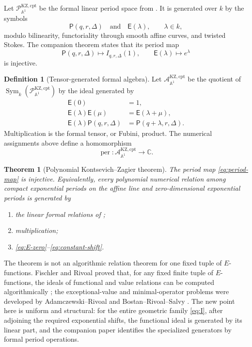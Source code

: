 \documentclass[11pt]{article}
\numberwithin{equation}{section}
\newtheorem{theorem}{Theorem}[section]
\theoremstyle{definition}
\newtheorem{definition}[definition]{Definition}
\theoremstyle{remark}
\newcommand{\C}{\mathbb C}
\newcommand{\Aone}{\mathbb A^1}
\newcommand{\Sym}{\operatorname{Sym}}
\newcommand{\per}{\operatorname{per}}
\newcommand{\Pcal}{\mathcal P}
\newcommand{\Acal}{\mathcal A}
\begin{document}
Let $\Pcal_{\Aone}^{\mathrm{KZ,cpt}}$ be the formal linear period space from
\cite{LongLinearKZ}.  It is generated over $k$ by the symbols
\[
  \mathsf P(q,r,\Delta)
  \quad\text{and}\quad
  \mathsf E(\lambda),\qquad \lambda\in k,
\]
modulo bilinearity, functoriality through smooth affine curves, and twisted
Stokes.  The companion theorem states that its period map
\[
  \mathsf P(q,r,\Delta)\longmapsto I_{q,r,\Delta}(1),
  \qquad
  \mathsf E(\lambda)\longmapsto e^\lambda
\]
is injective.

\begin{definition}[Tensor-generated formal algebra]\label{def:formal-algebra}
Let $\Acal_{\Aone}^{\mathrm{KZ,cpt}}$ be the quotient of
$\Sym_k(\Pcal_{\Aone}^{\mathrm{KZ,cpt}})$ by the ideal generated by
\begin{align}
  \mathsf E(0)&=1,\label{eq:E-zero}\\
  \mathsf E(\lambda)\mathsf E(\mu)
    &=\mathsf E(\lambda+\mu),\label{eq:E-product}\\
  \mathsf E(\lambda)\mathsf P(q,r,\Delta)
    &=\mathsf P(q+\lambda,r,\Delta).\label{eq:constant-shift}
\end{align}
Multiplication is the formal tensor, or Fubini, product.  The numerical
assignments above define a homomorphism
\begin{equation}\label{eq:period-map}
  \per:\Acal_{\Aone}^{\mathrm{KZ,cpt}}\longrightarrow\C.
\end{equation}
\end{definition}

\begin{theorem}[Polynomial Kontsevich--Zagier theorem]\label{thm:main}
The period map \eqref{eq:period-map} is injective.  Equivalently, every
polynomial numerical relation among compact exponential periods on the affine
line and zero-dimensional exponential periods is generated by
\begin{enumerate}[label=\textup{(\roman*)},leftmargin=2.4em]
\item the linear formal relations of \cite{LongLinearKZ};
\item multiplication;
\item \eqref{eq:E-zero}--\eqref{eq:constant-shift}.
\end{enumerate}
\end{theorem}

The theorem is not an algorithmic relation theorem for one fixed tuple of
$E$-functions.  Fischler and Rivoal proved that, for any fixed finite tuple of
$E$-functions, the ideals of functional and value relations can be computed
algorithmically \cite{FischlerRivoalEffective}; the exceptional-value and
minimal-operator problems were developed by Adamczewski--Rivoal and
Bostan--Rivoal--Salvy \cite{AdamczewskiRivoal,BostanRivoalSalvy}.  The new
point here is uniform and structural: for the entire geometric family
\eqref{eq:I}, after adjoining the required exponential shifts, the functional
ideal is generated by its linear part, and the companion paper identifies the
specialized generators by formal period operations.
\end{document}
